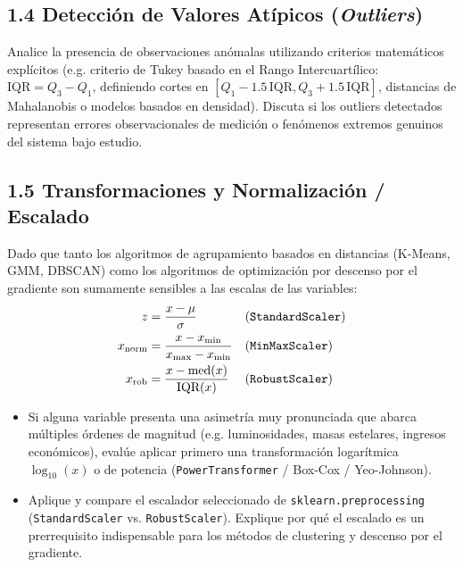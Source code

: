 \documentclass[11pt,a4paper]{article}
\begin{document}
\subsection{1.4 Detección de Valores Atípicos (\textit{Outliers})}
Analice la presencia de observaciones anómalas utilizando criterios matemáticos explícitos (e.g. criterio de Tukey basado en el Rango Intercuartílico: $\text{IQR} = Q_3 - Q_1$, definiendo cortes en $[Q_1 - 1.5\,\text{IQR}, Q_3 + 1.5\,\text{IQR}]$, distancias de Mahalanobis o modelos basados en densidad). Discuta si los outliers detectados representan errores observacionales de medición o fenómenos extremos genuinos del sistema bajo estudio.

\subsection{1.5 Transformaciones y Normalización / Escalado}
Dado que tanto los algoritmos de agrupamiento basados en distancias (K-Means, GMM, DBSCAN) como los algoritmos de optimización por descenso por el gradiente son sumamente sensibles a las escalas de las variables:
\begin{align}
    z &= \frac{x - \mu}{\sigma} && (\text{\texttt{StandardScaler}}) \\
    x_{\text{norm}} &= \frac{x - x_{\min}}{x_{\max} - x_{\min}} && (\text{\texttt{MinMaxScaler}}) \\
    x_{\text{rob}} &= \frac{x - \text{med}(x)}{\text{IQR}(x)} && (\text{\texttt{RobustScaler}})
\end{align}
\begin{itemize}[leftmargin=*,itemsep=2pt]
    \item Si alguna variable presenta una asimetría muy pronunciada que abarca múltiples órdenes de magnitud (e.g. luminosidades, masas estelares, ingresos económicos), evalúe aplicar primero una transformación logarítmica $\log_{10}(x)$ o de potencia (\texttt{PowerTransformer} / Box-Cox / Yeo-Johnson).
    \item Aplique y compare el escalador seleccionado de \texttt{sklearn.preprocessing} (\texttt{StandardScaler} vs. \texttt{RobustScaler}). Explique por qué el escalado es un prerrequisito indispensable para los métodos de clustering y descenso por el gradiente.
\end{itemize}

\end{document}
